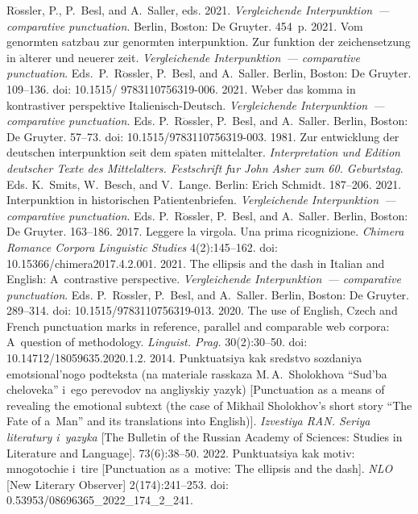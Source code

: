 \begin{multicols}{2}
{{\begin{thebibliography}{99}
R$\ddot{\mbox{o}}$ssler, P., P.~Besl, and A.~Saller, eds. 2021. \textit{Vergleichende 
Interpunktion~--- comparative punctuation}. Berlin, Boston: De Gruyter. 454~p.
 2021. Vom genormten satzbau zur genormten interpunktion. 
Zur funktion der zeichensetzung in $\ddot{\mbox{a}}$lterer und neuerer zeit. \textit{Vergleichende 
Interpunktion~--- comparative punctuation}. Eds.\ P.~R$\ddot{\mbox{o}}$ssler, 
P.~Besl, and A.~Saller. 
Berlin, Boston: De Gruyter. 109--136. doi: 10.1515/ 9783110756319-006.
 2021. Weber das komma in kontrastiver 
perspektive Italienisch-Deutsch. \textit{Vergleichende Interpunktion~--- comparative 
punctuation}. Eds. P.~R$\ddot{\mbox{o}}$ssler, P.~Besl, and A.~Saller. Berlin, Boston: De Gruyter.  
57--73. doi: 10.1515/9783110756319-003.
 1981. Zur entwicklung der deutschen interpunktion seit 
dem sp$\ddot{\mbox{a}}$ten mittelalter. \textit{Interpretation und Edition deutscher Texte des Mittelalters. 
Festschrift f$\ddot{\mbox{u}}$r John Asher zum 60. Geburtstag}. Eds. K.~Smits, W.~Besch, and 
V.~Lange. Berlin: Erich Schmidt. 187--206.
 2021. Interpunktion in historischen 
Patientenbriefen. \textit{Vergleichende Interpunktion~--- comparative punctuation}. Eds. 
P.~R$\ddot{\mbox{o}}$ssler, P.~Besl, and A.~Saller. Berlin, Boston: De Gruyter. 163--186.
 2017. Leggere la virgola. Una prima ricognizione. 
\textit{Chimera Romance Corpora Linguistic Studies} 4(2):145--162. doi: 
10.15366/chimera2017.4.2.001.
 2021. The ellipsis and the dash in Italian 
and English: A~contrastive perspective. \textit{Vergleichende Interpunktion~--- 
comparative punctuation}. Eds. P.~R$\ddot{\mbox{o}}$ssler, P.~Besl, and A.~Saller. Berlin, Boston: 
De Gruyter. 289--314. doi: 10.1515/9783110756319-013.
 2020. The use of English, Czech and French 
punctuation marks in reference, parallel and comparable web corpora: A~question 
of methodology. \textit{Linguist. Prag.} 30(2):30--50. doi: 
10.14712/18059635.2020.1.2.
 2014. Punk\-tu\-a\-tsiya kak sred\-st\-vo so\-zda\-niya 
emo\-tsi\-o\-nal'\-no\-go pod\-teks\-ta (na ma\-te\-ri\-ale ras\-ska\-za M.\,A.~Sho\-lo\-kho\-va ``Sud'\-ba 
che\-lo\-ve\-ka'' i~ego pe\-re\-vo\-dov na ang\-liy\-skiy yazyk) [Punctuation as a means of 
revealing the emotional subtext (the case of Mikhail Sholokhov's short story ``The 
Fate of a~Man'' and its translations into English)]. \textit{Izvestiya RAN. Seriya literatury i~yazyka}
 [The Bulletin of the Russian Academy of Sciences: Studies in Literature 
and Language]. 73(6):38--50.
 2022. Punk\-tu\-a\-tsiya kak mo\-tiv: mno\-go\-to\-chie i~ti\-re 
[Punctuation as a~motive: The ellipsis and the dash]. \textit{NLO} [New Literary Observer] 
2(174):241--253. doi: 0.53953/08696365\_2022\_174\_2\_241.
\end{thebibliography}

}}
\end{multicols}
